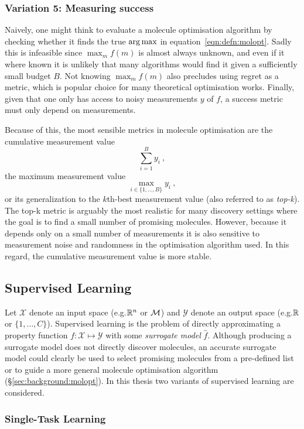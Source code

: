 \subsubsection{Variation 5: Measuring success}

Naively, one might think to evaluate a molecule optimisation
algorithm by checking whether it finds the true $\operatorname*{arg\,max}$ in equation~\ref{eqn:defn:molopt}.
Sadly this is infeasible since $\max_m{f(m)}$ is almost always unknown,
and even if it where known it is unlikely that many algorithms
would find it given a sufficiently small budget $B$.
Not knowing $\max_m{f(m)}$ also precludes using regret as a metric,
which is popular choice for many theoretical optimisation works.
Finally, given that one only has access to noisy measurements $y$ of $f$,
a success metric must only depend on measurements.

Because of this, the most sensible metrics in molecule optimisation
are the cumulative measurement value $$\sum_{i=1}^B y_i\ ,$$
the maximum measurement value $$\displaystyle \max_{i\in\{1,\ldots,B\}}y_i\ ,$$
or its generalization to the $k$th-best measurement value (also referred to as \emph{top-k}).
The top-k metric is arguably the most realistic for many discovery settings
where the goal is to find a small number of promising molecules.
However, because it depends only on a small number of measurements
it is also sensitive to measurement noise and randomness in the optimisation algorithm used.
In this regard, the cumulative measurement value is more stable.


\subsection{Supervised Learning}
\label{sec:background:supervised learning}

Let $\mathcal X$ denote an input space (e.g.\@ $\mathbb{R}^n$ or $\mathcal{M}$)
and $\mathcal Y$ denote an output space (e.g.\@ $\mathbb{R}$ or $\{1,\ldots,C\}$).
Supervised learning is the problem of directly approximating a property function $f:\mathcal X\mapsto \mathcal Y$
with some \emph{surrogate model} $\hat{f}$.
Although producing a surrogate model does not directly discover molecules,
an accurate surrogate model could clearly be used to select promising molecules
from a pre-defined list or to guide a more general molecule optimisation algorithm (\S\ref{sec:background:molopt}).
In this thesis two variants of supervised learning are considered.

\subsubsection{Single-Task Learning}

